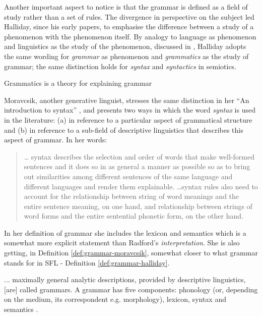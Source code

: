 Another important aspect to notice is that the grammar is defined as a field of study rather than a set of rules. The divergence in perspective on the subject led Halliday, since his early papers, to emphasise the difference between a study of a phenomenon with the phenomenon itself. By analogy to language as phenomenon and linguistics as the study of the phenomenon, discussed in  \citep{Halliday1997-linguistics}, Halliday adopts the same wording for \textit{grammar} as phenomenon and \textit{grammatics} as the study of grammar; the same distinction holds for \textit{syntax} and \textit{syntactics} in semiotics.

\begin{definition}\label{def:grammatics-halliday}
	Grammatics is a theory for explaining grammar \citep[369]{Halliday2002}
\end{definition}

Moravcsik, another generative linguist, stresses the same distinction in her ``An introduction to syntax'' \citep{Moravcsik2006}, and presents two ways in which the word \textit{syntax} is used in the literature: (a) in reference to a particular aspect of grammatical structure and (b) in reference to a sub-field of descriptive linguistics that describes this aspect of grammar. 
In her words: 

\begin{quote}
	\dots
	syntax describes the selection and order of words that make well-formed sentences and it does so in as general a manner as possible so as to bring out similarities among different sentences of the same language and different languages and render them explainable. \dots syntax rules also need to account for the relationship between string of word meanings and the entire sentence meaning, on one hand, and relationship between strings of word forms and the entire sentential phonetic form, on the other hand. \citep[25]{Moravcsik2006}	
\end{quote}

In her definition of grammar she includes the lexicon and semantics which is a somewhat more explicit statement than Radford's \textit{interpretation}. She is also getting, in Definition \ref{def:grammar-moravcsik}, somewhat closer to what grammar stands for in SFL - Definition \ref{def:grammar-halliday}. 

\begin{definition}\label{def:grammar-moravcsik}
... maximally general analytic descriptions, provided by descriptive linguistics, [are] called grammars. A grammar has five components: phonology (or, depending on the medium, its correspondent e.g. morphology), lexicon, syntax and semantics \citep[24--25]{Moravcsik2006}. 
\end{definition}

